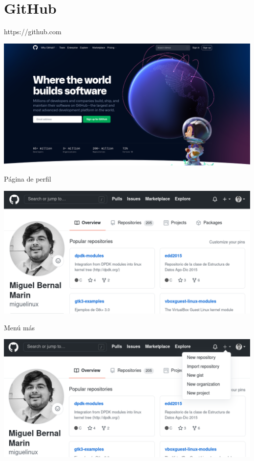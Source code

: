 \section{GitHub}

\begin{frame}[c]{https://github.com}
    \begin{center}
        \includegraphics[scale=0.24]{img/github.png}
    \end{center}
\end{frame}

\begin{frame}[c]{Página de perfil}
    \begin{center}
        \includegraphics[scale=0.3]{img/github-profile.png}
    \end{center}
\end{frame}

\begin{frame}[c]{Menú más}
    \begin{center}
        \includegraphics[scale=0.3]{img/github-plus-menu.png}
    \end{center}
\end{frame}

